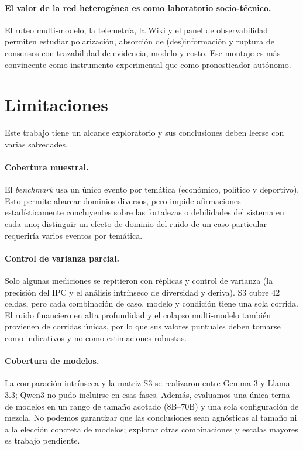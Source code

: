 \documentclass[11pt]{article}
\begin{document}
\paragraph{El valor de la red heterogénea es como laboratorio socio-técnico.} El ruteo multi-modelo, la telemetría, la Wiki y el panel de observabilidad permiten estudiar polarización, absorción de (des)información y ruptura de consensos con trazabilidad de evidencia, modelo y costo. Ese montaje es más convincente como instrumento experimental que como pronosticador autónomo.

\section*{Limitaciones}

Este trabajo tiene un alcance exploratorio y sus conclusiones deben leerse con varias salvedades.

\paragraph{Cobertura muestral.} El \textit{benchmark} usa un único evento por temática (económico, político y deportivo). Esto permite abarcar dominios diversos, pero impide afirmaciones estadísticamente concluyentes sobre las fortalezas o debilidades del sistema en cada uno; distinguir un efecto de dominio del ruido de un caso particular requeriría varios eventos por temática.

\paragraph{Control de varianza parcial.} Solo algunas mediciones se repitieron con réplicas y control de varianza (la precisión del IPC y el análisis intrínseco de diversidad y deriva). S3 cubre 42 celdas, pero cada combinación de caso, modelo y condición tiene una sola corrida. El ruido financiero en alta profundidad y el colapso multi-modelo también provienen de corridas únicas, por lo que sus valores puntuales deben tomarse como indicativos y no como estimaciones robustas.

\paragraph{Cobertura de modelos.} La comparación intrínseca y la matriz S3 se realizaron entre Gemma-3 y Llama-3.3; Qwen3 no pudo incluirse en esas fases. Además, evaluamos una única terna de modelos en un rango de tamaño acotado (8B--70B) y una sola configuración de mezcla. No podemos garantizar que las conclusiones sean agnósticas al tamaño ni a la elección concreta de modelos; explorar otras combinaciones y escalas mayores es trabajo pendiente.
\end{document}
